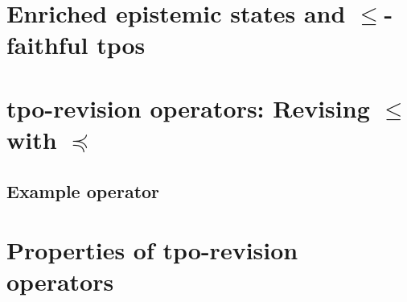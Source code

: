 \documentclass[11pt]{scrartcl}
\begin{document}

\section{Enriched epistemic states and $\leq$-faithful tpos}

\section{tpo-revision operators: Revising $\leq$ with $\preceq$}
\subsection{Example operator}

\section{Properties of tpo-revision operators}
\end{document}
